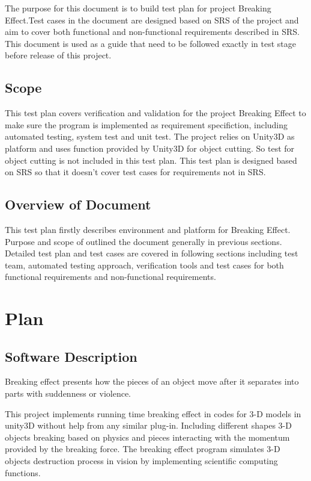 \documentclass[12pt, titlepage]{article}
\begin{document}
The purpose for this document is to build test plan for project Breaking Effect.Test cases in the document are designed based on SRS of the project and aim to cover both functional and non-functional requirements described in SRS.\\ 

This document is used as a guide that need to be followed exactly in test stage before release of this project. \\

\subsection{Scope}
This test plan covers verification and validation for the project Breaking Effect to make sure the program is implemented as requirement specifiction, including automated testing, system test and unit test. The project relies on Unity3D as platform and uses function provided by Unity3D for object cutting. So test for object cutting is not included in this test plan. This test plan is designed based on SRS so that it doesn't cover test cases for requirements not in SRS. 

\subsection{Overview of Document}

This test plan firstly describes environment and platform for Breaking Effect. Purpose and scope of outlined the document generally in previous sections. Detailed test plan and test cases are covered in following sections including test team, automated testing approach, verification tools and test cases for both functional requirements and non-functional requirements.

\section{Plan}
	
\subsection{Software Description}

Breaking effect presents how the pieces of an object move after it separates into parts with
suddenness or violence.

This project implements running time breaking effect in codes for 3-D models in unity3D without help from any similar plug-in. Including different shapes 3-D objects breaking based on physics and pieces interacting with the momentum provided by the breaking force. The breaking effect program simulates 3-D objects destruction process in vision by implementing scientific computing functions.
\end{document}
